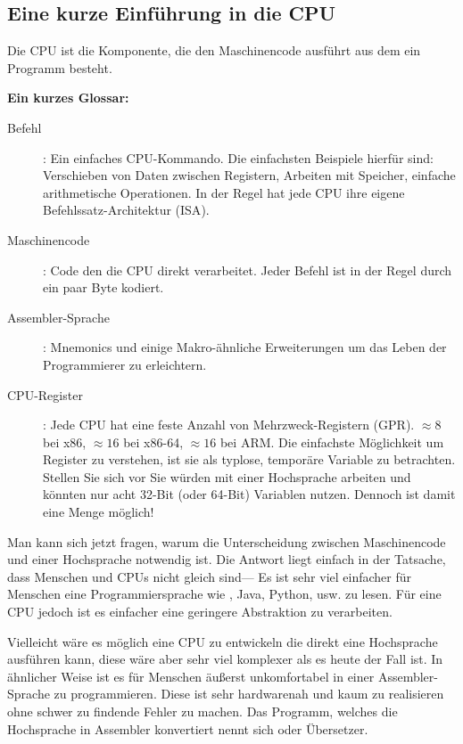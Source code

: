 \subsection{Eine kurze Einführung in die CPU}

Die \ac{CPU} ist die Komponente, die den Maschinencode ausführt aus dem ein Programm besteht.

\textbf{Ein kurzes Glossar:}

\begin{description}
\item[Befehl]: Ein einfaches \ac{CPU}-Kommando.
Die einfachsten Beispiele hierfür sind: Verschieben von Daten zwischen Registern, Arbeiten mit Speicher,
einfache arithmetische Operationen.
In der Regel hat jede \ac{CPU} ihre eigene Befehlssatz-Architektur (\ac{ISA}).

\item[Maschinencode]: Code den die \ac{CPU} direkt verarbeitet. 
Jeder Befehl ist in der Regel durch ein paar Byte kodiert.
\item[Assembler-Sprache]: Mnemonics und einige Makro-ähnliche Erweiterungen um das Leben der Programmierer zu erleichtern.
\item[CPU-Register]: Jede \ac{CPU} hat eine feste Anzahl von Mehrzweck-Registern (\ac{GPR}).
$\approx 8$ bei x86, $\approx 16$ bei x86-64, $\approx 16$ bei ARM.
Die einfachste Möglichkeit um Register zu verstehen, ist sie als typlose, temporäre Variable zu betrachten.
Stellen Sie sich vor Sie würden mit einer Hochsprache arbeiten und könnten nur acht 32-Bit (oder 64-Bit) Variablen
nutzen. Dennoch ist damit eine Menge möglich!
\end{description}


Man kann sich jetzt fragen, warum die Unterscheidung zwischen Maschinencode und einer Hochsprache notwendig ist.
Die Antwort liegt einfach in der Tatsache, dass Menschen und \ac{CPU}s nicht gleich sind---%
Es ist sehr viel einfacher für Menschen eine Programmiersprache wie \CCpp, Java, Python, usw. zu lesen. Für eine \ac{CPU} jedoch
ist es einfacher eine geringere Abstraktion zu verarbeiten.

Vielleicht wäre es möglich eine \ac{CPU} zu entwickeln die direkt eine Hochsprache ausführen kann,
diese wäre aber sehr viel komplexer als es heute der Fall ist.
In ähnlicher Weise ist es für Menschen äußerst unkomfortabel in einer Assembler-Sprache zu programmieren.
Diese ist sehr hardwarenah und kaum zu realisieren ohne schwer zu findende Fehler zu machen.
Das Programm, welches die Hochsprache in Assembler konvertiert nennt sich  oder Übersetzer.

